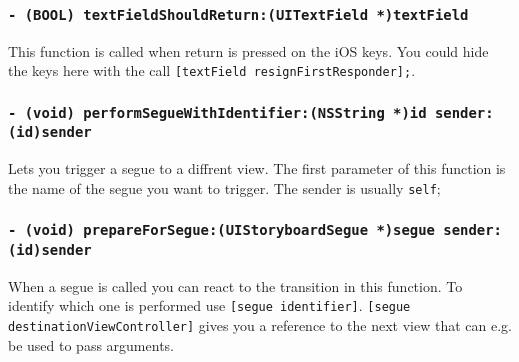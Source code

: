 \subsubsection{\lstinline^- (BOOL) textFieldShouldReturn:(UITextField *)textField^}
\label{subsubsec:textFieldShouldReturn}
This function is called when return is pressed on the iOS keys. You could hide the keys here with the call \lstinline^[textField resignFirstResponder];^.

\subsubsection{\lstinline^- (void) performSegueWithIdentifier:(NSString *)id sender:(id)sender^}
\label{subsubsec:performSegueWithIdentifier}
Lets you trigger a segue to a diffrent view. The first parameter of this function is the name of the segue you want to trigger. The sender is usually \lstinline^self^;

\subsubsection{\lstinline^- (void) prepareForSegue:(UIStoryboardSegue *)segue sender:(id)sender^}
\label{subsubsec:prepareForSegue}
When a segue is called you can react to the transition in this function. To identify which one is performed use \lstinline^[segue identifier]^. \lstinline{[segue destinationViewController]} gives you  a reference to the next view that can e.g. be used to pass arguments. 

